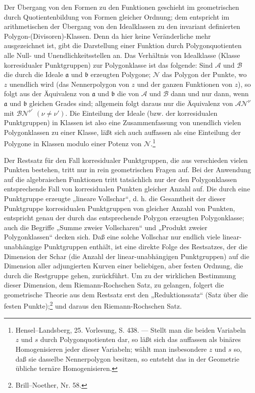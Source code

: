 \documentclass[11pt]{article}
\providecommand{\fra}{\mathfrak a}
\providecommand{\frb}{\mathfrak b}
\providecommand{\calA}{\mathcal A}
\providecommand{\calB}{\mathcal B}
\providecommand{\calN}{\mathcal N}
\begin{document}
Der Übergang von den Formen zu den Funktionen geschieht im geometrischen durch Quotientenbildung von Formen gleicher Ordnung; dem entspricht im arithmetischen der Übergang von den Idealklassen zu den invariant definierten Polygon-(Divisoren)-Klassen. Denn da hier keine Veränderliche mehr ausgezeichnet ist, gibt die Darstellung einer Funktion durch Polygonquotienten alle Null- und Unendlichkeitsstellen an. Das Verhältnis von Idealklasse (Klasse korresidualer Punktgruppen) zur Polygonklasse ist das folgende: Sind \(\calA\) und \(\calB\) die durch die Ideale \(\fra\) und \(\frb\) erzeugten Polygone; \(\calN\) das Polygon der Punkte, wo \(z\) unendlich wird (das Nennerpolygon von \(z\) und der ganzen Funktionen von \(z\)), so folgt aus der Äquivalenz von \(\fra\) und \(\frb\) die von \(\calA\) und \(\calB\) dann und nur dann, wenn \(\fra\) und \(\frb\) gleichen Grades sind; allgemein folgt daraus nur die Äquivalenz von \(\calA\calN^\nu\) mit \(\calB\calN^{\nu'}\) \((\nu\ne\nu')\). Die Einteilung der Ideale (bzw. der korresidualen Punktgruppen) in Klassen ist also eine Zusammenfassung von unendlich vielen Polygonklassen zu einer Klasse, läßt sich auch auffassen als eine Einteilung der Polygone in Klassen modulo einer Potenz von \(\calN\).\footnote{Hensel--Landsberg, 25. Vorlesung, S. 438. --- Stellt man die beiden Variabeln \(z\) und \(s\) durch Polygonquotienten dar, so läßt sich das auffassen als binäres Homogenisieren jeder dieser Variabeln; wählt man insbesondere \(z\) und \(s\) so, daß sie dasselbe Nennerpolygon besitzen, so entsteht das in der Geometrie übliche ternäre Homogenisieren.}

Der Restsatz für den Fall korresidualer Punktgruppen, die aus verschieden vielen Punkten bestehen, tritt nur in rein geometrischen Fragen auf. Bei der Anwendung auf die algebraischen Funktionen tritt tatsächlich nur der den Polygonklassen entsprechende Fall von korresidualen Punkten gleicher Anzahl auf. Die durch eine Punktgruppe erzeugte „lineare Vollschar“, d. h. die Gesamtheit der dieser Punktgruppe korresidualen Punktgruppen von gleicher Anzahl von Punkten, entspricht genau der durch das entsprechende Polygon erzeugten Polygonklasse; auch die Begriffe „Summe zweier Vollscharen“ und „Produkt zweier Polygonklassen“ decken sich. Daß eine solche Vollschar nur endlich viele linear-unabhängige Punktgruppen enthält, ist eine direkte Folge des Restsatzes, der die Dimension der Schar (die Anzahl der linear-unabhängigen Punktgruppen) auf die Dimension aller adjungierten Kurven einer beliebigen, aber festen Ordnung, die durch die Restgruppe gehen, zurückführt. Um zu der wirklichen Bestimmung dieser Dimension, dem Riemann-Rochschen Satz, zu gelangen, folgert die geometrische Theorie aus dem Restsatz erst den „Reduktionssatz“ (Satz über die festen Punkte);\footnote{Brill--Noether, Nr. 58.} und daraus den Riemann-Rochschen Satz.
\end{document}
